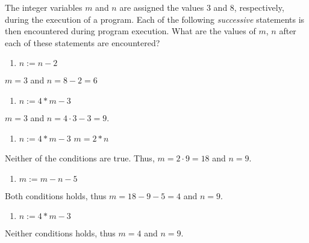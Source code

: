 \begin{problem}[15]
  The integer variables $m$ and $n$ are assigned the values $3$ and $8$,
  respectively, during the execution of a program. Each of the following
  \emph{successive} statements is then encountered during program execution.
  What are the values of $m$, $n$ after each of these statements are
  encountered?
  \begin{enumerate}
    \item
      \begin{algorithmic}
        \STATE {} $n := n - 2$ \ENDIF
      \end{algorithmic}
  \end{enumerate}
  $m = 3$ and $n = 8  - 2 = 6$
  \begin{enumerate}[resume]
    \item 
      \begin{algorithmic}
        \STATE {}
        $n := 4 * m - 3$ \ENDIF
      \end{algorithmic}
  \end{enumerate}
  $m = 3$ and $n = 4\cdot 3 - 3 = 9$.
  \begin{enumerate}[resume]
    \item
      \begin{algorithmic}
        \STATE {}
              \STATE $n := 4 * m - 3$
        \ELSE
              \STATE $m = 2*n$
        \ENDIF
      \end{algorithmic}
  \end{enumerate}
  Neither of the conditions are true. Thus,  $m = 2\cdot 9 = 18$ and $n=9$.
  \begin{enumerate}[resume]
    \item
      \begin{algorithmic}
        \STATE {}
        $m := m - n - 5$ \ENDIF
      \end{algorithmic}
  \end{enumerate}
  Both conditions holds, thus $m = 18 - 9 - 5 = 4$ and $n = 9$.
  \begin{enumerate}[resume]
    \item
      \begin{algorithmic}
        \STATE {}
        $n := 4 * m - 3$ \ENDIF
      \end{algorithmic}
  \end{enumerate}
  Neither conditions holds, thus $m = 4$ and $n = 9$.
\end{problem}

